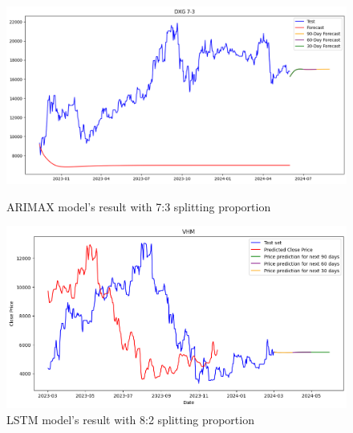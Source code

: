 \documentclass{ieeeojies}
\begin{document}
  \begin{figure}[H]
    \centering
    \begin{minipage}{0.23\textwidth}
    \centering
    \includegraphics[width=1\textwidth]{bibliography/Figure/ARIMAX_DXG(7-3).png}
    \caption{ARIMAX model's result with 7:3 splitting proportion}
    \label{fig:1}
    \end{minipage}
    \hfill
    \begin{minipage}{0.23\textwidth}
    \centering
    \includegraphics[width=1\textwidth]{bibliography/Figure/VHM_LSTM(8-2).png}
    \caption{LSTM model's result with 8:2 splitting proportion}
    \label{fig:2}
    \end{minipage}
  \end{figure}
\end{document}
